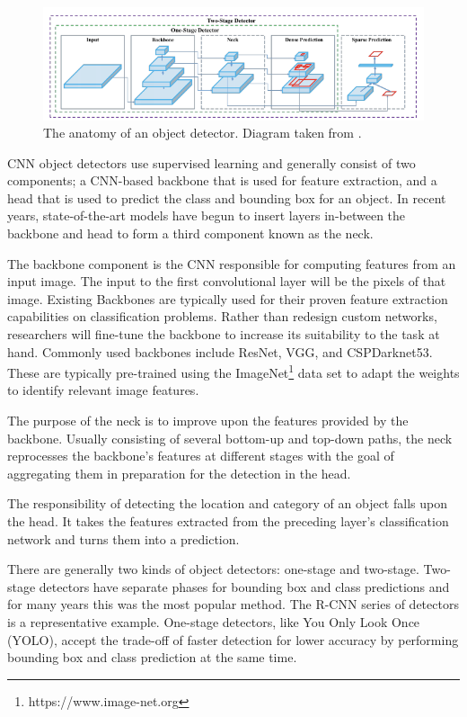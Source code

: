 \documentclass{thesis}
\begin{document}
\begin{figure}[h]
    \centering
    \includegraphics[scale=0.6]{images/cnn-diagram.png}
    \caption{The anatomy of an object detector. Diagram taken from \cite{yolov4}.}
    \label{fig:cnn-diagram}
\end{figure}

CNN object detectors use supervised learning and generally consist of two components; a CNN-based backbone that is used for feature extraction, and a head that is used to predict the class and bounding box for an object. In recent years, state-of-the-art models have begun to insert layers in-between the backbone and head to form a third component known as the neck.

The backbone component is the CNN responsible for computing features from an input image. The input to the first convolutional layer will be the pixels of that image. Existing Backbones are typically used for their proven feature extraction capabilities on classification problems. Rather than redesign custom networks, researchers will fine-tune the backbone to increase its suitability to the task at hand. Commonly used backbones include ResNet, VGG, and CSPDarknet53\cite{zhu2021tphyolov5}. These are typically pre-trained using the ImageNet\footnote{https://www.image-net.org} data set to adapt the weights to identify relevant image features\cite{breakdown-yolo4}.

The purpose of the neck is to improve upon the features provided by the backbone. Usually consisting of several bottom-up and top-down paths, the neck reprocesses the backbone's features at different stages with the goal of aggregating them in preparation for the detection in the head.

The responsibility of detecting the location and category of an object falls upon the head. It takes the features extracted from the preceding layer's classification network and turns them into a prediction. 

There are generally two kinds of object detectors: one-stage and two-stage. Two-stage detectors have separate phases for bounding box and class predictions and for many years this was the most popular method. The R-CNN series of detectors\cite{frcnn} is a representative example. One-stage detectors, like You Only Look Once (YOLO), accept the trade-off of faster detection for lower accuracy by performing bounding box and class prediction at the same time.
\end{document}
